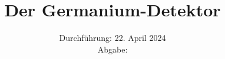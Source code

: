

\subject{\texorpdfstring{\vspace{2ex}}{}V18\texorpdfstring{\vspace{-2ex}}{}} %
\title{Der Germanium-Detektor} %
\date{
	Durchführung: 22. April 2024 %
	\\ Abgabe:  %
}




\maketitle
\thispagestyle{empty}


\tableofcontents
\newpage








\printbibliography{}

\newpage



